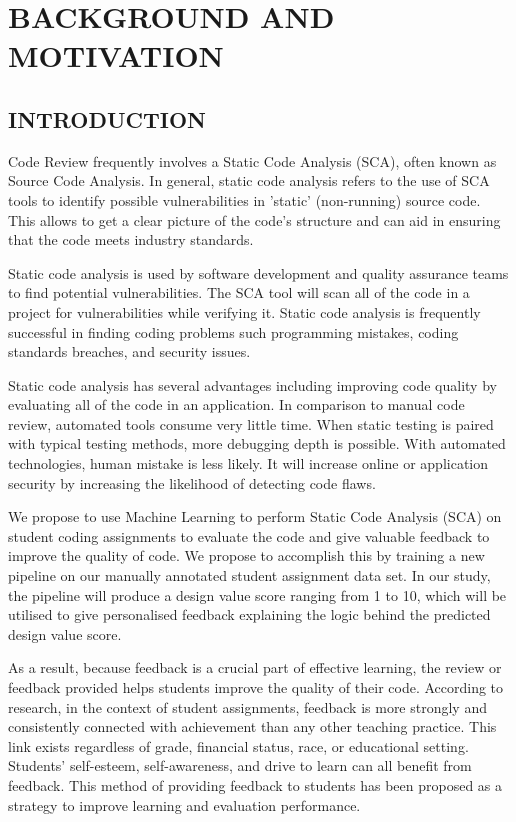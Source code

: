
\chapter{BACKGROUND AND MOTIVATION} %
%

\section{INTRODUCTION} %
Code Review frequently involves a Static Code Analysis (SCA), often known as Source Code Analysis. In general, static code analysis refers to the use of SCA tools to identify possible vulnerabilities in 'static' (non-running) source code. This allows to get a clear picture of the code's structure and can aid in ensuring that the code meets industry standards.

Static code analysis is used by software development and quality assurance teams to find potential vulnerabilities. The SCA tool will scan all of the code in a project for vulnerabilities while verifying it. Static code analysis is frequently successful in finding coding problems such programming mistakes, coding standards breaches, and security issues.

Static code analysis has several advantages including
improving code quality by evaluating all of the code in an
application. In comparison to manual code review, automated tools consume very little time. When static testing is paired with typical testing methods, more debugging depth is possible. With automated technologies, human mistake is less likely. It will increase online or application security by increasing the likelihood of detecting code flaws.

We propose to use Machine Learning to perform Static Code
Analysis (SCA) on student coding assignments to evaluate the
code and give valuable feedback to improve the quality of
code. We propose to accomplish this by training a new
pipeline on our manually annotated student assignment data
set. In our study, the pipeline will produce a design value
score ranging from 1 to 10, which will be utilised to give
personalised feedback explaining the logic behind the
predicted design value score.

As a result, because feedback is a crucial part of effective
learning, the review or feedback provided helps students
improve the quality of their code. According to research, in
the context of student assignments, feedback is more strongly
and consistently connected with achievement than any other
teaching practice. This link exists regardless of grade,
financial status, race, or educational setting. Students'
self-esteem, self-awareness, and drive to learn can all
benefit from feedback. This method of providing feedback to
students has been proposed as a strategy to improve learning
and evaluation performance.

